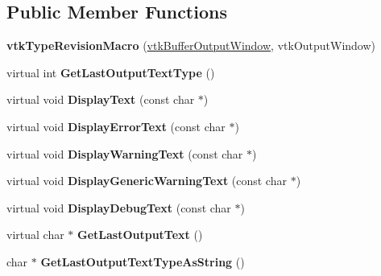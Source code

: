 \subsection*{Public Member Functions}
\begin{DoxyCompactItemize}
\item 
\hypertarget{classvtkBufferOutputWindow_afd19096fa4aa7913e893fb5abdd0cc98}{
{\bfseries vtkTypeRevisionMacro} (\hyperlink{classvtkBufferOutputWindow}{vtkBufferOutputWindow}, vtkOutputWindow)}
\label{classvtkBufferOutputWindow_afd19096fa4aa7913e893fb5abdd0cc98}

\item 
\hypertarget{classvtkBufferOutputWindow_add01eaa7f7b60fcdeca76c8231560d24}{
virtual int {\bfseries GetLastOutputTextType} ()}
\label{classvtkBufferOutputWindow_add01eaa7f7b60fcdeca76c8231560d24}

\item 
\hypertarget{classvtkBufferOutputWindow_a3e517990355da23f2e2ee8771fa9b16d}{
virtual void {\bfseries DisplayText} (const char $\ast$)}
\label{classvtkBufferOutputWindow_a3e517990355da23f2e2ee8771fa9b16d}

\item 
\hypertarget{classvtkBufferOutputWindow_acf6afdc765b77ee1b733b0c59593030d}{
virtual void {\bfseries DisplayErrorText} (const char $\ast$)}
\label{classvtkBufferOutputWindow_acf6afdc765b77ee1b733b0c59593030d}

\item 
\hypertarget{classvtkBufferOutputWindow_ab7bc064af99237c9b751a0cf71695255}{
virtual void {\bfseries DisplayWarningText} (const char $\ast$)}
\label{classvtkBufferOutputWindow_ab7bc064af99237c9b751a0cf71695255}

\item 
\hypertarget{classvtkBufferOutputWindow_a7cd70d39ea9f13ec313d3045d231e33e}{
virtual void {\bfseries DisplayGenericWarningText} (const char $\ast$)}
\label{classvtkBufferOutputWindow_a7cd70d39ea9f13ec313d3045d231e33e}

\item 
\hypertarget{classvtkBufferOutputWindow_ab698cd926b6ee0f60bef55c62c0ef6a6}{
virtual void {\bfseries DisplayDebugText} (const char $\ast$)}
\label{classvtkBufferOutputWindow_ab698cd926b6ee0f60bef55c62c0ef6a6}

\item 
\hypertarget{classvtkBufferOutputWindow_ad521d799383234ed654517818e019ad6}{
virtual char $\ast$ {\bfseries GetLastOutputText} ()}
\label{classvtkBufferOutputWindow_ad521d799383234ed654517818e019ad6}

\item 
\hypertarget{classvtkBufferOutputWindow_ac2345b86da92e8ea87bc45c3fe4044ec}{
char $\ast$ {\bfseries GetLastOutputTextTypeAsString} ()}
\label{classvtkBufferOutputWindow_ac2345b86da92e8ea87bc45c3fe4044ec}

\end{DoxyCompactItemize}
